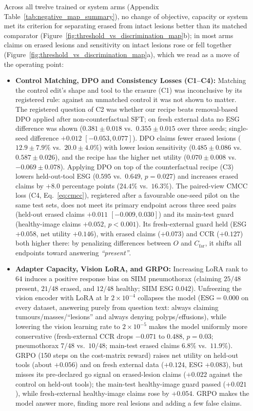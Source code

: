 \documentclass[5p,times,twocolumn,authoryear]{elsarticle}
\begin{document}
Across all twelve trained or system arms (Appendix Table~\ref{tab:negative_map_summary}), no change of objective, capacity or system met its criterion for separating erased from intact lesions better than its matched comparator (Figure~\ref{fig:threshold_vs_discrimination_map}b); in most arms claims on erased lesions and sensitivity on intact lesions rose or fell together (Figure~\ref{fig:threshold_vs_discrimination_map}a), which we read as a move of the operating point:
\begin{itemize}[leftmargin=*,nosep]
    \item \textbf{Control Matching, DPO and Consistency Losses (C1--C4):} Matching the control edit's shape and tool to the erasure (C1) was inconclusive by its registered rule: against an unmatched control it was not shown to matter. The registered question of C2 was whether our recipe beats removal-based DPO applied after non-counterfactual SFT; on fresh external data no ESG difference was shown ($0.381 \pm 0.018$ vs.\ $0.355 \pm 0.015$ over three seeds; single-seed difference $+0.012$ $[-0.053, 0.077]$). DPO claims fewer erased lesions ($12.9 \pm 7.9\%$ vs.\ $20.0 \pm 4.0\%$) with lower lesion sensitivity ($0.485 \pm 0.086$ vs.\ $0.587 \pm 0.026$), and the recipe has the higher net utility ($0.070 \pm 0.008$ vs.\ $-0.069 \pm 0.078$). Applying DPO on top of the counterfactual recipe (C3) lowers held-out-tool ESG ($0.595$ vs.\ $0.649$, $p = 0.027$) and increases erased claims by $+8.0$ percentage points ($24.4\%$ vs.\ $16.3\%$). The paired-view CMCC loss (C4, Eq.~\ref{eq:cmcc}), registered after a favourable one-seed pilot on the same test sets, does not meet its primary endpoint across three seed pairs (held-out erased claims $+0.011$ $[-0.009, 0.030]$) and its main-test guard (healthy-image claims $+0.052$, $p<0.001$). Its fresh-external guard held (ESG $+0.058$, net utility $+0.146$), with erased claims ($+0.073$) and CCR ($+0.127$) both higher there: by penalizing differences between $O$ and $C_{\text{far}}$, it shifts all endpoints toward answering \emph{``present''}.
    \item \textbf{Adapter Capacity, Vision LoRA, and GRPO:} Increasing LoRA rank to $64$ induces a positive response bias on SIIM pneumothorax (claiming $25/48$ present, $21/48$ erased, and $12/48$ healthy; SIIM ESG $0.042$). Unfreezing the vision encoder with LoRA at $\text{lr } 2\times 10^{-4}$ collapses the model ($\text{ESG} = 0.000$ on every dataset, answering purely from question text: always claiming tumours/masses/``lesions'' and always denying polyps/effusions), while lowering the vision learning rate to $2\times 10^{-5}$ makes the model uniformly more conservative (fresh-external CCR drops $-0.071$ to $0.488$, $p=0.03$; pneumothorax $7/48$ vs.\ $10/48$; main-test erased claims $6.8\%$ vs.\ $11.9\%$). GRPO (150 steps on the cost-matrix reward) raises net utility on held-out tools (about $+0.056$) and on fresh external data ($+0.124$, ESG $+0.083$), but misses its pre-declared go signal on erased-lesion claims ($+0.022$ against the control on held-out tools); the main-test healthy-image guard passed ($+0.021$), while fresh-external healthy-image claims rose by $+0.054$. GRPO makes the model answer more, finding more real lesions and adding a few false claims.

\end{itemize}
\end{document}
